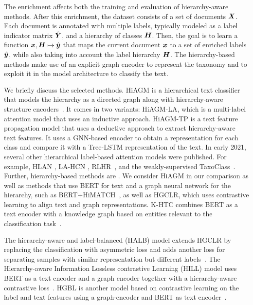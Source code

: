 \documentclass[acmsmall,nonacm]{acmart}
\begin{document}
The enrichment affects both the training and evaluation of hierarchy-aware methods.
After this enrichment, the dataset consists of a set of documents ${\bm{X}}$. Each document is annotated with multiple labels, typically modeled as a label indicator matrix $\hat{{\bm{Y}}}$, and a hierarchy of classes ${\bm{H}}$.
Then, the goal is to learn a function ${\bm{x}}, {\bm{H}} \mapsto \hat{{\bm{y}}}$ that maps the current document ${\bm{x}}$ to a set of enriched labels $\hat{{\bm{y}}}$, while also taking into account the label hierarchy ${\bm{H}}$. 
The hierarchy-based methods make use of an explicit graph encoder to represent the taxonomy and to exploit it in the model architecture to classify the text.

We briefly discuss the selected methods.
HiAGM is a hierarchical text classifier that models the hierarchy as a directed graph along with hierarchy-aware structure encoders~\cite{hiagm}.  
It comes in two variants: HiAGM-LA, which is a multi-label attention model that uses an inductive approach.  
HiAGM-TP is a text feature propagation model that uses a deductive approach to extract hierarchy-aware text features. It uses a GNN-based encoder to obtain a representation for each class and compare it with a Tree-LSTM representation of the text.  
In early 2021, several other hierarchical label-based attention models were published.  For example, HLAN \cite{dong2021explainable}, LA-HCN \cite{DBLP:journals/corr/abs-2009-10938}, RLHR~\cite{liu2021improving}, and the
weakly-supervised Taxo\-Class~\cite{shen-etal-2021-taxoclass}.
Further, hierarchy-based methods are
\cite{DBLP:journals/corr/abs-1812-11270,DBLP:journals/corr/abs-1902-09347,DBLP:journals/corr/abs-1909-00161}.
We consider HiAGM in our comparison as well as methods that use BERT for text and a graph neural
network for the hierarchy, such as BERT+HiMATCH~\cite{DBLP:conf/acl/ChenMLY20}, as well as HGCLR, which uses contrastive learning to align text and graph representations.
K-HTC combines BERT as a text encoder with a knowledge graph based on entities relevant to the classification task~\cite{DBLP:conf/acl/LiuZHWZ0C23-k-htc}. 

The hierarchy-aware and label-balanced (HALB) model extends HGCLR by replacing the classification with asymmetric loss and adds another loss for separating samples with similar representation but different labels~\cite{DBLP:journals/kbs/ZhangLSXTH24-halb}.
The Hierarchy-aware Information Lossless contrastive Learning (HILL) model uses BERT as a text encoder and a graph encoder together with a hierarchy-aware contrastive loss~\cite{hill2024}.
HGBL is another model based on contrastive learning on the label and text features using a graph-encoder and BERT as text encoder~\cite{DBLP:journals/npl/ZhangDLZ25-hgbl}.
\end{document}
